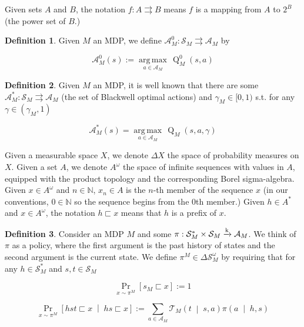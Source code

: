 \documentclass[11pt]{article}
\theoremstyle{definition}
\newtheorem{definition}{Definition}%
\theoremstyle{plain}
\newcommand{\AP}[1]{\left(#1\right)}
\newcommand{\AB}[1]{\left[#1\right]}
\newcommand{\APM}[2]{\left(#1\;\middle\vert\;#2\right)}
\newcommand{\ABM}[2]{\left[#1\;\middle\vert\;#2\right]}
\newcommand{\Pa}[2]{\underset{#1}{\operatorname{Pr}}\AB{#2}}
\newcommand{\CP}[3]{\underset{#1}{\operatorname{Pr}}\ABM{#2}{#3}}
\newcommand{\Argmax}[1]{\underset{#1}{\operatorname{arg\,max}}\,}
\newcommand{\Nats}{\mathbb{N}}
\newcommand{\K}{\xrightarrow{\textnormal{k}}}
\newcommand{\A}{\mathcal{A}}
\newcommand{\St}{\mathcal{S}}
\newcommand{\T}{\mathcal{T}}
\newcommand{\Q}{\operatorname{Q}}
\begin{document}
Given sets $A$ and $B$, the notation $f: A \rightrightarrows B$ means $f$ is a mapping from $A$ to $2^B$ (the power set of $B$.)

\begin{samepage}
\begin{definition}

Given $M$ an MDP, we define $\A_M^0: \St_M \rightrightarrows \A_M$ by

\begin{equation}
\A_M^0(s) := \Argmax{a \in \A_M} \Q_M^0(s,a)
\end{equation}

\end{definition}
\end{samepage}

\begin{samepage}
\begin{definition}

Given $M$ an MDP, it is well known that there are some $\A_M^*: \St_M \rightrightarrows \A_M$ (the set of Blackwell optimal actions) and $\gamma_M\in[0,1)$ s.t. for any $\gamma\in\AP{\gamma_M,1}$

\begin{equation}
\A_M^*(s) = \Argmax{a \in \A_M} \Q_M\AP{s,a,\gamma}
\end{equation}

\end{definition}
\end{samepage}

Given a measurable space $X$, we denote $\Delta X$ the space of probability measures on $X$. Given a set $A$, we denote $A^\omega$ the space of infinite sequences with values in $A$, equipped with the product topology and the corresponding Borel sigma-algebra. Given $x\in A^\omega$ and $n \in \Nats$, $x_n \in A$ is the $n$-th member of the sequence $x$ (in our conventions, $0 \in \Nats$ so the sequence begins from the 0th member.) Given $h \in A^*$ and $x \in A^\omega$, the notation $h \sqsubset x$ means that $h$ is a prefix of $x$.

\begin{samepage}
\begin{definition}

Consider an MDP $M$ and some $\pi: \St_M^* \times \St_M \K \A_M$. We think of $\pi$ as a policy, where the first argument is the past history of states and the second argument is the current state. We define $\pi^M \in \Delta\St_M^\omega$ by requiring that for any $h \in \St_M^*$ and $s,t \in \St_M$

\begin{equation}
\Pa{x\sim\pi^M }{s_M \sqsubset x} := 1
\end{equation}


\begin{equation}
\CP{x\sim\pi^M }{hst \sqsubset x}{hs \sqsubset x} := \sum_{a \in \A_M} {\T_M\APM{t}{s,a} \pi\APM{a}{h,s}}
\end{equation}

\end{definition}
\end{samepage}
\end{document}
